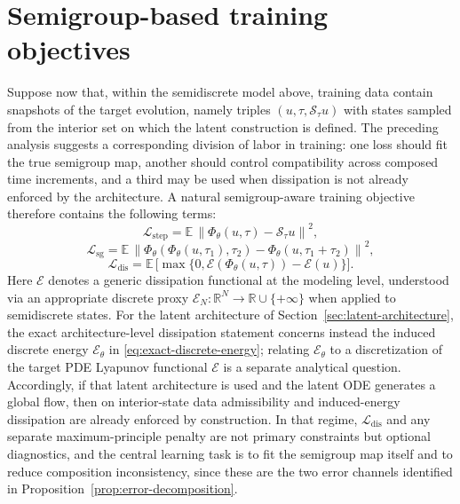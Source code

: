 \documentclass[11pt]{article}
\newcommand{\R}{\mathbb{R}}
\newcommand{\cS}{\mathcal{S}}
\newcommand{\cE}{\mathcal{E}}
\newcommand{\PhiT}{\Phi_{\theta}}
\newcommand{\norm}[1]{\left\lVert #1 \right\rVert}
\begin{document}
\section{Semigroup-based training objectives}\label{sec:training}
Suppose now that, within the semidiscrete model above, training data contain snapshots of the target evolution, namely triples \((u,\tau,\cS_{\tau}u)\) with states sampled from the interior set on which the latent construction is defined. The preceding analysis suggests a corresponding division of labor in training: one loss should fit the true semigroup map, another should control compatibility across composed time increments, and a third may be used when dissipation is not already enforced by the architecture. A natural semigroup-aware training objective therefore contains the following terms:
\begin{equation}\label{eq:loss-step}
\mathcal L_{\mathrm{step}}=\mathbb E\,\norm{\PhiT(u,\tau)-\cS_{\tau}u}^2,
\end{equation}
\begin{equation}\label{eq:loss-sg}
\mathcal L_{\mathrm{sg}}=\mathbb E\,\norm{\PhiT(\PhiT(u,\tau_1),\tau_2)-\PhiT(u,\tau_1+\tau_2)}^2,
\end{equation}
\begin{equation}\label{eq:loss-dis}
\mathcal L_{\mathrm{dis}}=\mathbb E\,\bigl[\max\{0,\cE(\PhiT(u,\tau)) - \cE(u)\}\bigr].
\end{equation}
Here \(\cE\) denotes a generic dissipation functional at the modeling level, understood via an appropriate discrete proxy \(\cE_N:\R^N\to\R\cup\{+\infty\}\) when applied to semidiscrete states. For the latent architecture of Section~\ref{sec:latent-architecture}, the exact architecture-level dissipation statement concerns instead the induced discrete energy \(\cE_{\theta}\) in \eqref{eq:exact-discrete-energy}; relating \(\cE_{\theta}\) to a discretization of the target PDE Lyapunov functional \(\cE\) is a separate analytical question. Accordingly, if that latent architecture is used and the latent ODE generates a global flow, then on interior-state data admissibility and induced-energy dissipation are already enforced by construction. In that regime, \(\mathcal L_{\mathrm{dis}}\) and any separate maximum-principle penalty are not primary constraints but optional diagnostics, and the central learning task is to fit the semigroup map itself and to reduce composition inconsistency, since these are the two error channels identified in Proposition~\ref{prop:error-decomposition}.
\end{document}
